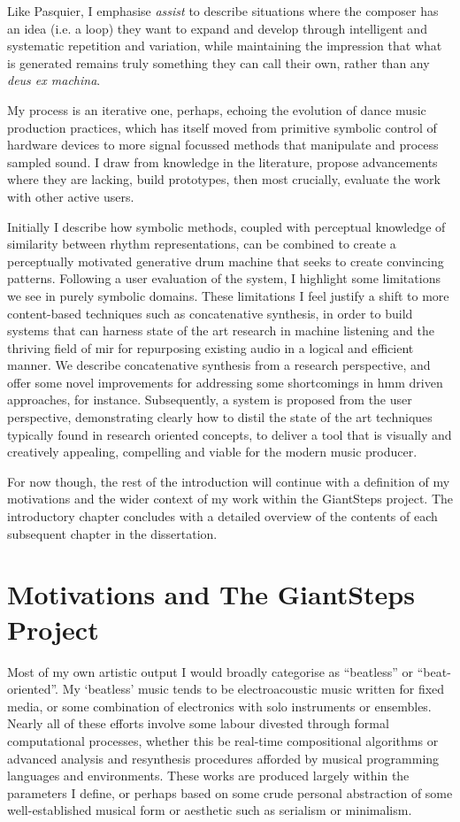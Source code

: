 Like Pasquier, I emphasise \textit{assist} to describe situations where the composer has an idea (i.e. a loop) they want to expand and develop through intelligent and systematic repetition and variation, while maintaining the impression that what is generated remains truly something they can call their own, rather than any \textit{deus ex machina}.

My process is an iterative one, perhaps, echoing the evolution of dance music production practices, which has itself moved from primitive symbolic control of hardware devices to more signal focussed methods that manipulate and process sampled sound. I draw from knowledge in the literature, propose advancements where they are lacking, build prototypes, then most crucially, evaluate the work with other active users. 

Initially I describe how symbolic methods, coupled with perceptual knowledge of similarity between rhythm representations, can be combined to create a perceptually motivated generative drum machine that seeks to create convincing patterns. Following a user evaluation of the system, I highlight some limitations we see in purely symbolic domains. These limitations I feel justify a shift to more content-based techniques such as concatenative synthesis, in order to build systems that can harness state of the art research in machine listening and the thriving field of \acrfull{mir} for repurposing existing audio in a logical and efficient manner. We describe concatenative synthesis from a research perspective, and offer some novel improvements for addressing some shortcomings in \acrfull{hmm} driven approaches, for instance. Subsequently, a system is proposed from the user perspective, demonstrating clearly how to distil the state of the art techniques typically found in research oriented concepts, to deliver a tool that is visually and creatively appealing, compelling and viable for the modern music producer. 

For now though, the rest of the introduction will continue with a definition of my motivations and the wider context of my work within the GiantSteps project. The introductory chapter concludes with a detailed overview of the contents of each subsequent chapter in the dissertation.

\section{Motivations and The GiantSteps Project}

Most of my own artistic output I would broadly categorise as ``beatless'' or ``beat-oriented''. My `beatless' music tends to be electroacoustic music written for fixed media, or some combination of electronics with solo instruments or ensembles. Nearly all of these efforts involve some labour divested through formal computational processes, whether this be real-time compositional algorithms \citep{Nuanain2014} or advanced analysis and resynthesis procedures afforded by musical programming languages and environments. These works are produced largely within the parameters I define, or perhaps based on some crude personal abstraction of some well-established musical form or aesthetic such as serialism or minimalism. 

